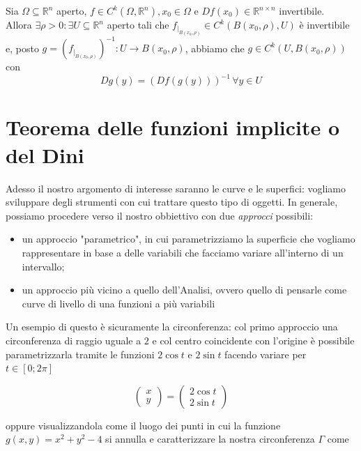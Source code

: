 \vspace{0.5cm}
\begin{theorem}[\textcolor{blue}{Della funzione inversa}]
Sia $\Omega \subseteq \mathbb{R}^n$ aperto, $f \in C^k(\Omega, \mathbb{R}^n), x_0 \in \Omega$ e $Df(x_0) \in \mathbb{R}^{n \times n}$ invertibile. \\
Allora $\exists \rho > 0: \exists U \subseteq \mathbb{R}^n$ aperto tali che $f_{|_{B(x_0, \rho)}} \in C^{k}(B(x_0, \rho), U)$ è invertibile e, posto $g=(f_{|_{B(x_0, \rho)}})^{-1}:U \to B(x_0, \rho)$, abbiamo che
$g \in C^k(U, B(x_0, \rho))$ con
$$
Dg(y) = (Df(g(y)))^{-1} \, \forall y \in U
$$
\end{theorem}

\vspace{0.5cm}
\section{Teorema delle funzioni implicite o del Dini}
Adesso il nostro argomento di interesse saranno le curve e le superfici: vogliamo sviluppare degli strumenti con cui trattare questo tipo di oggetti. In generale, possiamo procedere verso il nostro obbiettivo con due \emph{approcci} possibili:

\begin{itemize}
	\item un approccio "parametrico", in cui parametrizziamo la superficie che vogliamo rappresentare in base a delle variabili che facciamo variare all'interno di un intervallo;
	\item un approccio più vicino a quello dell'Analisi, ovvero quello di pensarle come curve di livello di una funzioni a più variabili
\end{itemize}

Un esempio di questo è sicuramente la circonferenza: col primo approccio una circonferenza di raggio uguale a $2$ e col centro coincidente con l'origine è possibile parametrizzarla tramite le funzioni $2\cos{t}$ e $2\sin{t}$ facendo variare per $t \in [0; 2\pi]$

$$
\begin{pmatrix}
	x \\
	y
\end{pmatrix} = \begin{pmatrix}
	2\cos{t} \\
	2\sin{t}
\end{pmatrix}
$$

oppure visualizzandola come il luogo dei punti in cui la funzione $g(x, y) = x^2 + y^2 - 4$ si annulla e caratterizzare la nostra circonferenza $\Gamma$ come

